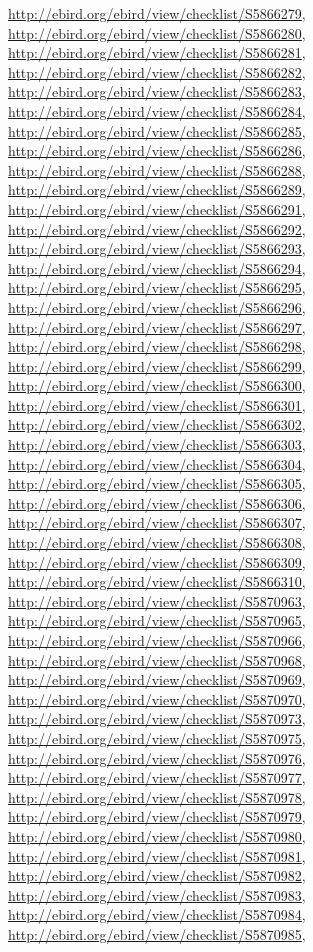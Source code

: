 \documentclass[9pt, article]{memoir}
\begin{document}
\begin{multicols}{2}
\url{http://ebird.org/ebird/view/checklist/S5866279}, 
\url{http://ebird.org/ebird/view/checklist/S5866280}, 
\url{http://ebird.org/ebird/view/checklist/S5866281}, 
\url{http://ebird.org/ebird/view/checklist/S5866282}, 
\url{http://ebird.org/ebird/view/checklist/S5866283}, 
\url{http://ebird.org/ebird/view/checklist/S5866284}, 
\url{http://ebird.org/ebird/view/checklist/S5866285}, 
\url{http://ebird.org/ebird/view/checklist/S5866286}, 
\url{http://ebird.org/ebird/view/checklist/S5866288}, 
\url{http://ebird.org/ebird/view/checklist/S5866289}, 
\url{http://ebird.org/ebird/view/checklist/S5866291}, 
\url{http://ebird.org/ebird/view/checklist/S5866292}, 
\url{http://ebird.org/ebird/view/checklist/S5866293}, 
\url{http://ebird.org/ebird/view/checklist/S5866294}, 
\url{http://ebird.org/ebird/view/checklist/S5866295}, 
\url{http://ebird.org/ebird/view/checklist/S5866296}, 
\url{http://ebird.org/ebird/view/checklist/S5866297}, 
\url{http://ebird.org/ebird/view/checklist/S5866298}, 
\url{http://ebird.org/ebird/view/checklist/S5866299}, 
\url{http://ebird.org/ebird/view/checklist/S5866300}, 
\url{http://ebird.org/ebird/view/checklist/S5866301}, 
\url{http://ebird.org/ebird/view/checklist/S5866302}, 
\url{http://ebird.org/ebird/view/checklist/S5866303}, 
\url{http://ebird.org/ebird/view/checklist/S5866304}, 
\url{http://ebird.org/ebird/view/checklist/S5866305}, 
\url{http://ebird.org/ebird/view/checklist/S5866306}, 
\url{http://ebird.org/ebird/view/checklist/S5866307}, 
\url{http://ebird.org/ebird/view/checklist/S5866308}, 
\url{http://ebird.org/ebird/view/checklist/S5866309}, 
\url{http://ebird.org/ebird/view/checklist/S5866310}, 
\url{http://ebird.org/ebird/view/checklist/S5870963}, 
\url{http://ebird.org/ebird/view/checklist/S5870965}, 
\url{http://ebird.org/ebird/view/checklist/S5870966}, 
\url{http://ebird.org/ebird/view/checklist/S5870968}, 
\url{http://ebird.org/ebird/view/checklist/S5870969}, 
\url{http://ebird.org/ebird/view/checklist/S5870970}, 
\url{http://ebird.org/ebird/view/checklist/S5870973}, 
\url{http://ebird.org/ebird/view/checklist/S5870975}, 
\url{http://ebird.org/ebird/view/checklist/S5870976}, 
\url{http://ebird.org/ebird/view/checklist/S5870977}, 
\url{http://ebird.org/ebird/view/checklist/S5870978}, 
\url{http://ebird.org/ebird/view/checklist/S5870979}, 
\url{http://ebird.org/ebird/view/checklist/S5870980}, 
\url{http://ebird.org/ebird/view/checklist/S5870981}, 
\url{http://ebird.org/ebird/view/checklist/S5870982}, 
\url{http://ebird.org/ebird/view/checklist/S5870983}, 
\url{http://ebird.org/ebird/view/checklist/S5870984}, 
\url{http://ebird.org/ebird/view/checklist/S5870985}, 

\end{multicols}
\end{document}

